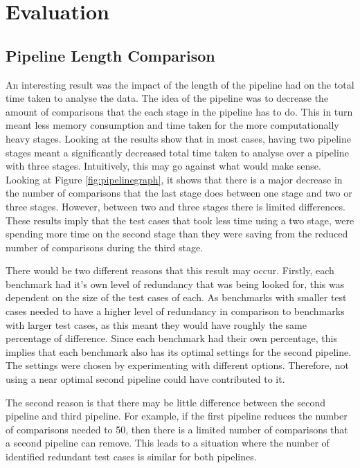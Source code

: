 \chapter{Evaluation}\label{C:evaluation}

\section{Pipeline Length Comparison}
\label{sec:pipelineEva}
An interesting result was the impact of the length of the pipeline had on the total time taken to analyse the data. The idea of the pipeline was to decrease the amount of comparisons that the each stage in the pipeline has to do. This in turn meant less memory consumption and time taken for the more computationally heavy stages. Looking at the results show that in most cases, having two pipeline stages meant a significantly decreased total time taken to analyse over a pipeline with three stages. Intuitively, this may go against what would make sense. Looking at Figure \ref{fig:pipelinegraph}, it shows that there is a major decrease in the number of comparisons that the last stage does between one stage and two or three stages. However, between two and three stages there is limited differences. These results imply that the test cases that took less time using a two stage, were spending more time on the second stage than they were saving from the reduced number of comparisons during the third stage. 

There would be two different reasons that this result may occur. Firstly, each benchmark had it's own level of redundancy that was being looked for, this was dependent on the size of the test cases of each. As benchmarks with smaller test cases needed to have a higher level of redundancy in comparison to benchmarks with larger test cases, as this meant they would have roughly the same percentage of difference. Since each benchmark had their own percentage, this implies that each benchmark also has its optimal settings for the second pipeline. The settings were chosen by experimenting with different options. Therefore, not using a near optimal second pipeline could have contributed to it. 

The second reason is that there may be little difference between the second pipeline and third pipeline. For example, if the first pipeline reduces the number of comparisons needed to 50, then there is a limited number of comparisons that a second pipeline can remove. This leads to a situation where the number of identified redundant test cases is similar for both pipelines.

